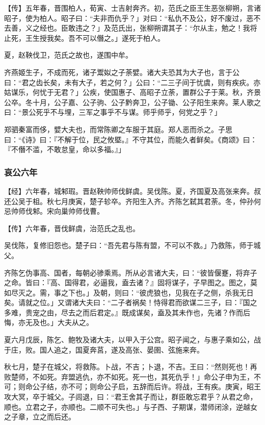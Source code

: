 \documentclass[]{article}
\begin{document}
【传】五年春，晋围柏人，荀寅、士吉射奔齐。初，范氏之臣王生恶张柳朔，言诸昭子，使为柏人。昭子曰：``夫非而仇乎？」对曰：``私仇不及公，好不废过，恶不去善，义之经也。臣敢违之？」及范氏出，张柳朔谓其子：``尔从主，勉之！我将止死，王生授我矣。吾不可以僭之。」遂死于柏人。

夏，赵鞅伐卫，范氏之故也，遂围中牟。

齐燕姬生子，不成而死，诸子鬻姒之子荼嬖。诸大夫恐其为大子也，言于公曰：``君之齿长矣，未有大子，若之何？」公曰：``二三子间于忧虞，则有疾疢。亦姑谋乐，何忧于无君？」公疾，使国惠子、高昭子立荼，置群公子于莱。秋，齐景公卒。冬十月，公子嘉、公子驹、公子黔奔卫，公子锄、公子阳生来奔。莱人歌之曰：``景公死乎不与埋，三军之事乎不与谋。师乎师乎，何党之乎？」

郑驷秦富而侈，嬖大夫也，而常陈卿之车服于其庭。郑人恶而杀之。子思曰：``《诗》曰：『不解于位，民之攸塈。』不守其位，而能久者鲜矣。《商颂》曰：『不僭不滥，不敢怠皇，命以多福。』」

\hypertarget{header-n3094}{%
\subsubsection{哀公六年}\label{header-n3094}}

【经】六年春，城邾瑕。晋赵鞅帅师伐鲜虞。吴伐陈。夏，齐国夏及高张来奔。叔还公吴于柤。秋七月庚寅，楚子轸卒。齐阳生入齐。齐陈乞弑其君荼。冬，仲孙何忌帅师伐邾。宋向巢帅师伐曹。

【传】六年春，晋伐鲜虞，治范氏之乱也。

吴伐陈，复修旧怨也。楚子曰：``吾先君与陈有盟，不可以不救。」乃救陈，师于城父。

齐陈乞伪事高、国者，每朝必骖乘焉。所从必言诸大夫，曰：``彼皆偃蹇，将弃子之命。皆曰：『高、国得君，必逼我，盍去诸？』固将谋子，子早图之。图之，莫如尽灭之。需，事之下也。」及朝，则曰：``彼虎狼也，见我在子之侧，杀我无日矣。请就之位。」又谓诸大夫曰：``二子者祸矣！恃得君而欲谋二三子，曰：『国之多难，贵宠之由，尽去之而后君定。』既成谋矣，盍及其未作也，先诸？作而后悔，亦无及也。」大夫从之。

夏六月戊辰，陈乞、鲍牧及诸大夫，以甲入于公宫。昭子闻之，与惠子乘如公，战于庄，败。国人追之，国夏奔莒，遂及高张、晏圉、弦施来奔。

秋七月，楚子在城父，将救陈。卜战，不吉；卜退，不吉。王曰：``然则死也！再败楚师，不如死。弃盟逃仇，亦不如死。死一也，其死仇乎！」命公子申为王，不可；则命公子结，亦不可；则命公子启，五辞而后许。将战，王有疾。庚寅，昭王攻大冥，卒于城父。子闾退，曰：``君王舍其子而让，群臣敢忘君乎？从君之命，顺也。立君之子，亦顺也。二顺不可失也。」与子西、子期谋，潜师闭涂，逆越女之子章，立之而后还。
\end{document}
